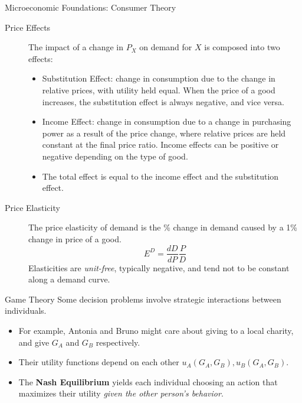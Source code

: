 \documentclass[10pt]{extarticle}
\begin{document}
\begin{problem}{Microeconomic Foundations: Consumer Theory}
\begin{description}
\begin{itemize}
        \end{itemize}
      \item[Price Effects] The impact of a change in $P_X$ on demand for $X$ is composed into two effects:
        \begin{itemize}
          \item Substitution Effect: change in consumption due to the change in relative prices, with utility held equal. When the price of a good increases, the substitution effect is always negative, and vice versa.
          \item Income Effect: change in consumption due to a change in purchasing power as a result of the price change, where relative prices are held constant at the final price ratio. Income effects can be positive or negative depending on the type of good.
          \item The total effect is equal to the income effect and the substitution effect.
        \end{itemize}
    \end{description}
    \begin{center}
      \begin{tcbraster}[raster columns = 1,colframe = black!75!white,colback=white,title=Income and Substitution Effects]
      \end{tcbraster}
    \end{center}
    \begin{description}
      \item[Price Elasticity] The price elasticity of demand is the \% change in demand caused by a 1\% change in price of a good.
        \[
          E^D = \frac{dD}{dP}\frac{P}{D}
        \] 
      Elasticities are \textit{unit-free}, typically negative, and tend not to be constant along a demand curve.
    \end{description}
  \end{problem}
  \begin{problem}{Game Theory}
    Some decision problems involve strategic interactions between individuals.
    \begin{itemize}
      \item For example, Antonia and Bruno might care about giving to a local charity, and give $G_A$ and $G_B$ respectively. 
      \item Their utility functions depend on each other $u_A(G_A,G_B),u_B(G_A,G_B)$.
      \item The \textbf{Nash Equilibrium} yields each individual choosing an action that maximizes their utility \textit{given the other person's behavior}.
    \end{itemize}
  \end{problem}
\end{document}
